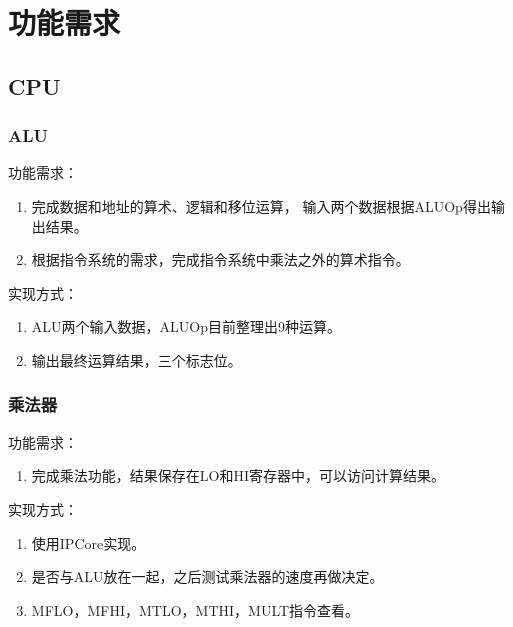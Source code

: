 \section{功能需求}
    \subsection{CPU}
        \subsubsection{ALU}
            功能需求：
            \begin{enumerate}
            \item
            完成数据和地址的算术、逻辑和移位运算，%
            输入两个数据根据ALUOp得出输出结果。
            \item
            根据指令系统的需求，完成指令系统中乘法之外的算术指令。
            \end{enumerate}

            实现方式：
            \begin{enumerate}
            \item
            ALU两个输入数据，ALUOp目前整理出9种运算。
            \item
            输出最终运算结果，三个标志位。
            \end{enumerate}

        \subsubsection{乘法器}
            功能需求：
            \begin{enumerate}
            \item
            完成乘法功能，结果保存在LO和HI寄存器中，可以访问计算结果。
            \end{enumerate}

            实现方式：
            \begin{enumerate}
                \item
            使用IPCore实现。
            \item
            是否与ALU放在一起，之后测试乘法器的速度再做决定。
            \item
            MFLO，MFHI，MTLO，MTHI，MULT指令查看。
            \end{enumerate}

